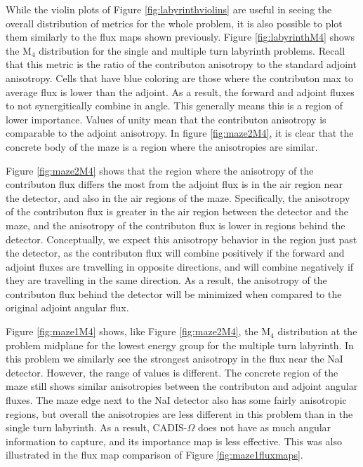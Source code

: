 While the violin plots of Figure \ref{fig:labyrinthviolins} are useful in seeing
the overall distribution of metrics for the whole problem, it is also possible
to plot them similarly to the flux maps shown previously. Figure
\ref{fig:labyrinthM4} shows the M$_4$ distribution for the single and multiple
turn labyrinth problems. Recall that this metric is the ratio of the contributon
anisotropy to the standard adjoint anisotropy. Cells that have blue coloring
are those where the contributon max to average flux is lower than the adjoint.
As a result, the forward and adjoint fluxes to not synergitically combine in
angle. This
generally means this is a region of lower importance. Values of unity mean that
the contributon anisotropy is comparable to the adjoint anisotropy. In figure
\ref{fig:maze2M4}, it is clear that the concrete body of the maze is a region
where the anisotropies are similar.

Figure \ref{fig:maze2M4} shows that the region where the anisotropy of the
contributon flux differs the most from the adjoint flux is in the air region
near the detector, and also in the air regions of the maze. Specifically, the
anisotropy of the contributon flux is greater in the air region between the
detector and the maze, and the anisotropy of the contributon flux is lower in
regions behind the detector. Conceptually, we expect this anisotropy behavior
in the region just past the detector, as the contributon flux will combine
positively if the forward and adjoint fluxes are travelling in opposite
directions, and will combine negatively if they are travelling in the same
direction. As a result, the anisotropy of the contributon flux behind the
detector will be minimized when compared to the original adjoint angular flux.

Figure \ref{fig:maze1M4} shows, like Figure \ref{fig:maze2M4}, the M$_4$
distribution at the problem midplane for the lowest energy group for
the multiple turn labyrinth. In this problem we similarly see the strongest
anisotropy in the flux near the NaI detector. However, the range of values is
different. The concrete region of the maze still shows similar anisotropies
between the contributon and adjoint angular fluxes. The maze edge next to the
NaI detector also has some fairly anisotropic regions, but overall the
anisotropies are less different in this problem than in the single turn
labyrinth. As a result, CADIS-$\Omega$ does not have as much angular information
to capture, and its importance map is less effective. This was also illustrated
in the flux map comparison of Figure \ref{fig:maze1fluxmaps}.

